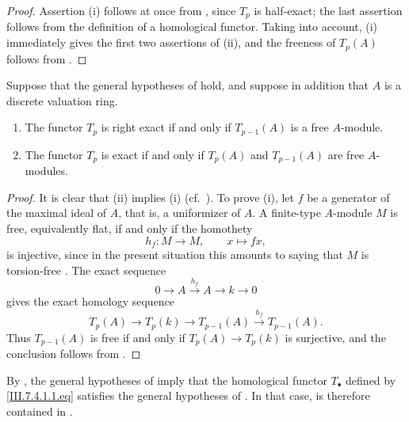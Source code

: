 \begin{proof}
Assertion (i) follows at once from , since
$T_p$ is half-exact; the last assertion follows from the
definition of a homological functor.  Taking
 into account, (i) immediately gives the first
two assertions of (ii), and the freeness of $T_p(A)$ follows
from .
\end{proof}

\begin{corollary}[7.5.6]
\label{III.7.5.6}
Suppose that the general hypotheses of  hold,
and suppose in addition that $A$ is a discrete valuation
ring.
\begin{enumerate}
  \item[(i)] The functor $T_p$ is right exact if and only if
    $T_{p-1}(A)$ is a free $A$-module.
  \item[(ii)] The functor $T_p$ is exact if and only if
    $T_p(A)$ and $T_{p-1}(A)$ are free $A$-modules.
\end{enumerate}
\end{corollary}

\begin{proof}
It is clear that (ii) implies (i) (cf.\
).  To prove (i), let $f$ be a generator of
the maximal ideal of $A$, that is, a uniformizer of $A$.  A
finite-type $A$-module $M$ is free, equivalently flat, if and
only if the homothety
\[
  h_f:M\longrightarrow M,\qquad x\longmapsto fx,
\]
is injective, since in the present situation this amounts to
saying that $M$ is torsion-free .  The exact
sequence
\[
  0
  \longrightarrow A
  \xrightarrow{h_f}
  A
  \longrightarrow k
  \longrightarrow 0
\]
gives the exact homology sequence
\[
  T_p(A)
  \longrightarrow T_p(k)
  \longrightarrow T_{p-1}(A)
  \xrightarrow{h_f}
  T_{p-1}(A).
\]
Thus $T_{p-1}(A)$ is free if and only if
$T_p(A)\to T_p(k)$ is surjective, and the conclusion follows
from .
\end{proof}

\begin{remark}[7.5.7]
\label{III.7.5.7}
By , the general hypotheses of
 imply that the homological functor
$T_\bullet$ defined by \eqref{III.7.4.1.1.eq} satisfies the
general hypotheses of .  In that case,
 is therefore contained in
.
\end{remark}
